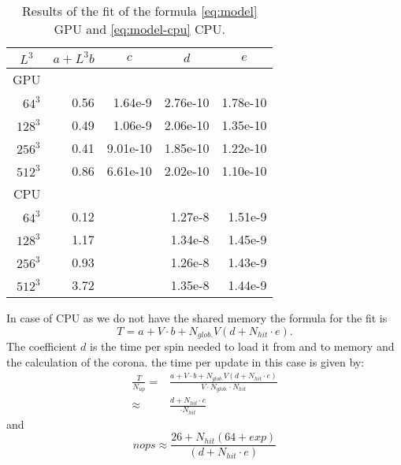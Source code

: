 \documentclass[a4paper]{llncs}
\begin{document}
\begin{table}
\begin{center}
\begin{tabular}{||r|D{.}{.}{8}|D{.}{.}{8}|D{.}{.}{8}|D{.}{.}{8}||}
\hline\hline
{} 
& 
& 
& 
&\\\hline\hline
GPU & \\\hline
$64^3$  & 0.56  & 1.64e-9       & 	2.76e-10       & 1.78e-10 \\
$128^3$ & 0.49  & 1.06e-9       &	2.06e-10       & 1.35e-10 \\
$256^3$ & 0.41  & 9.01e-10	&       1.85e-10       & 1.22e-10\\
$512^3$ & 0.86  & 6.61e-10	&       2.02e-10       & 1.10e-10\\\hline\hline
CPU & \\\hline
$64^3$  &  0.12 &       & 	1.27e-8 &	1.51e-9\\
$128^3$ & 1.17  &       &	1.34e-8 & 	1.45e-9\\
$256^3$ & 0.93  &       &	1.26e-8 &       1.43e-9\\
$512^3$ & 3.72  &       &       1.35e-8 &       1.44e-9\\\hline\hline
\end{tabular}
\end{center}
\caption{\label{tab:fit}Results of the fit of the formula \eqref{eq:model} GPU
and \eqref{eq:model-cpu} CPU.}
\end{table}
In case of CPU as we do not have the shared memory the formula for the fit is
\begin{equation}\label{eq:model-cpu}
T  = a+ V \cdot b +
N_{glob.} V \left(d + N_{hit}\cdot e\right) . 
\end{equation}
The coefficient $d$ is the time per spin needed to load it from and to memory
and the calculation of the corona. the time per update in this case is given by:
\begin{equation}\begin{split}
\frac{T}{N_{up}}=&\frac{a+ V \cdot b + N_{glob.} V \left(d + N_{hit}\cdot e\right)}{V\cdot N_{glob.}\cdot N_{hit}}\\
\approx&
\frac{d + N_{hit}\cdot e}{\cdot N_{hit}}
\end{split}
\end{equation}
and
\begin{equation}
nops\approx \frac{ 26+N_{hit}(64+exp)}{ \left(d + N_{hit}\cdot e\right)}
\end{equation}
\end{document}
